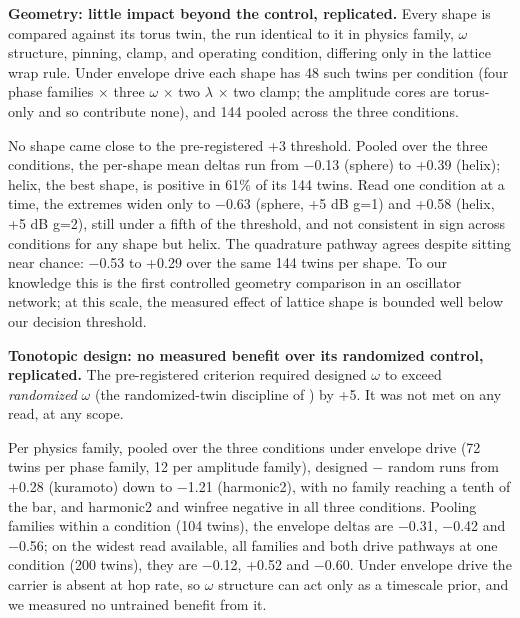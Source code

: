 \documentclass{article}
\newcounter{none} %
\begin{document}
\textbf{Geometry: little impact beyond the control, replicated.} Every
shape is compared against its torus twin, the run identical to it in
physics family, \ensuremath{\omega} structure, pinning, clamp, and
operating condition, differing only in the lattice wrap rule. Under
envelope drive each shape has 48 such twins per condition (four phase
families \ensuremath{\times} three \ensuremath{\omega}
\ensuremath{\times} two \ensuremath{\lambda} \ensuremath{\times} two
clamp; the amplitude cores are torus-only and so contribute none), and
144 pooled across the three conditions.

No shape came close to the pre-registered +3 threshold. Pooled over the
three conditions, the per-shape mean deltas run from \ensuremath{-}0.13
(sphere) to +0.39 (helix); helix, the best shape, is positive in 61\% of
its 144 twins. Read one condition at a time, the extremes widen only to
\ensuremath{-}0.63 (sphere, +5 dB g=1) and +0.58 (helix, +5 dB g=2),
still under a fifth of the threshold, and not consistent in sign across
conditions for any shape but helix. The quadrature pathway agrees
despite sitting near chance: \ensuremath{-}0.53 to +0.29 over the same
144 twins per shape. To our knowledge this is the first controlled
geometry comparison in an oscillator network; at this scale, the
measured effect of lattice shape is bounded well below our decision
threshold.

\textbf{Tonotopic design: no measured benefit over its randomized
control, replicated.} The pre-registered criterion required designed
\ensuremath{\omega} to exceed \emph{randomized} \ensuremath{\omega} (the
randomized-twin discipline of \citep{caranzano}) by +5. It was not met
on any read, at any scope.

Per physics family, pooled over the three conditions under envelope
drive (72 twins per phase family, 12 per amplitude family), designed
\ensuremath{-} random runs from +0.28 (kuramoto) down to
\ensuremath{-}1.21 (harmonic2), with no family reaching a tenth of the
bar, and harmonic2 and winfree negative in all three conditions. Pooling
families within a condition (104 twins), the envelope deltas are
\ensuremath{-}0.31, \ensuremath{-}0.42 and \ensuremath{-}0.56; on the
widest read available, all families and both drive pathways at one
condition (200 twins), they are \ensuremath{-}0.12, +0.52 and
\ensuremath{-}0.60. Under envelope drive the carrier is absent at hop
rate, so \ensuremath{\omega} structure can act only as a timescale
prior, and we measured no untrained benefit from it.
\end{document}
